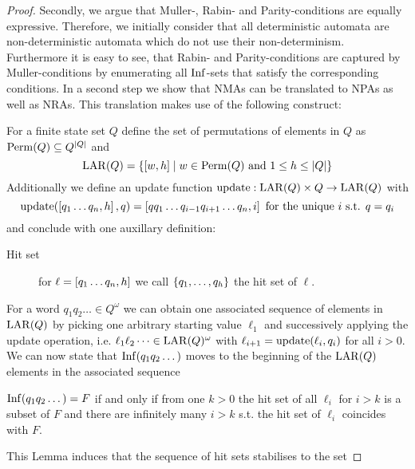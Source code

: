 \begin{proof}
  Secondly, we argue that Muller-, Rabin- and Parity-conditions are
  equally expressive. Therefore, we initially consider that all deterministic
  automata are non-deterministic automata which do not use their
  non-determinism. Furthermore it is easy to see, that Rabin- and
  Parity-conditions are captured by Muller-conditions by enumerating all
  $\operatorname{Inf}$-sets that satisfy the corresponding conditions. In a second step we
  show that \acp{NMA} can be translated to \acp{NPA} as well as \acp{NRA}. This
  translation makes use of the following construct:
  \begin{definition}
    For a finite state set $Q$ define the set of permutations of elements in
    $Q$ as $\operatorname{Perm}(Q)\subseteq Q^{\left\vert{Q}\right\vert}$ and
    \begin{equation*}
      \operatorname{LAR}(Q) = \left\{\left[w,h\right]\mid w\in\operatorname{Perm}(Q)\text{ and }1\leq
      h\leq\left\vert{Q}\right\vert\right\}
    \end{equation*}
    Additionally we define an update function
    $\operatorname{update}:\operatorname{LAR}(Q)\times Q\rightarrow\operatorname{LAR}(Q)$ with
    \begin{equation*}
      \operatorname{update}(\left[q_{1}\dots q_{n},h\right], q)
      = \left[qq_{1}\dots q_{i-1}q_{i+1}\dots q_{n},i\right]
      \text{ for the unique }i\text{ s.t. }q=q_{i}
    \end{equation*}
    and conclude with one auxillary definition:
    \begin{description}
      \item [Hit set] for $\ell = \left[q_{1}\dots q_{n},h\right]$ we call
        $\left\{q_{1},\dots,q_{h}\right\}$ the hit set of $\ell$.
    \end{description}
  \end{definition}
  For a word $q_{1}q_{2}\dots\in Q^{\omega}$ we can obtain one associated
  sequence of elements in $\operatorname{LAR}(Q)$ by picking one arbitrary starting value
  $\ell_{1}$ and successively applying the update operation, i.e.
  $\ell_{1}\ell_{2}\dots\in\operatorname{LAR}(Q)^{\omega}$ with
  $\ell_{i+1} = \operatorname{update}(\ell_{i},q_{i})$ for all $i>0$. We can now state that
  $\operatorname{Inf}(q_{1}q_{2}\dots)$ moves to the beginning of the $\operatorname{LAR}(Q)$ elements in
  the associated sequence
  \begin{lemma}
    \cite[Lemma 1.21]{AutoLogInfGames}
    $\operatorname{Inf}(q_{1}q_{2}\dots) = F$ if and only if from one $k>0$ the hit set of
    all $\ell_{i}$ for $i>k$ is a subset of $F$ and there are infinitely many
    $i>k$ s.t. the hit set of $\ell_{i}$ coincides with $F$.
  \end{lemma}
  This Lemma induces that the sequence of hit sets stabilises to the set

\end{proof}
